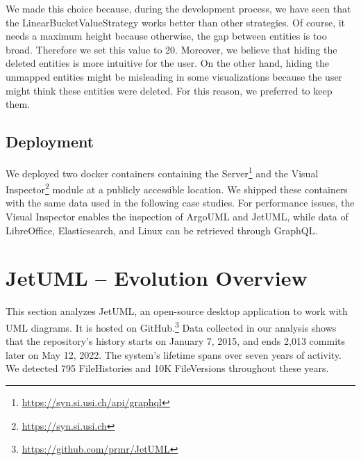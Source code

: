 We made this choice because, during the development process, we have seen that the LinearBucketValueStrategy works better than other strategies. Of course, it needs a maximum height because otherwise, the gap between entities is too broad. Therefore we set this value to 20. Moreover, we believe that hiding the deleted entities is more intuitive for the user. On the other hand, hiding the unmapped entities might be misleading in some visualizations because the user might think these entities were deleted. For this reason, we preferred to keep them. 

\subsection*{Deployment}
We deployed two docker containers containing the Server\footnote{\url{https://syn.si.usi.ch/api/graphql}} and the Visual Inspector\footnote{\url{https://syn.si.usi.ch}} module at a publicly accessible location. We shipped these containers with the same data used in the following case studies. For performance issues, the Visual Inspector enables the inspection of ArgoUML and JetUML, while data of LibreOffice, Elasticsearch, and Linux can be retrieved through GraphQL. 


\newpage
\section{JetUML – Evolution Overview}
This section analyzes JetUML, an open-source desktop application to work with UML diagrams. It is hosted on GitHub.\footnote{\url{https://github.com/prmr/JetUML}} Data collected in our analysis shows that the repository's history starts on January 7, 2015, and ends 2,013 commits later on May 12, 2022. The system's lifetime spans over seven years of activity. We detected 795 FileHistories and 10K FileVersions throughout these years.

